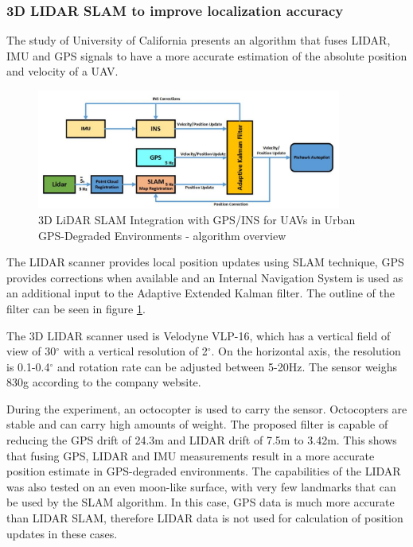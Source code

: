 \subsubsection{3D LIDAR SLAM to improve localization accuracy} \label{lidar_for_localization}

The study of University of California\cite{hening20173d} presents an algorithm that fuses LIDAR, IMU and GPS signals 
to have a more accurate estimation of the absolute position and velocity of a UAV. 
\begin{figure}[!ht]
    \centering
	\includegraphics[width=100mm, keepaspectratio]{figures/hening_filter.png}
    \caption{3D LiDAR SLAM Integration with GPS/INS for UAVs in Urban GPS-Degraded Environments \cite{hening20173d} - algorithm overview}
    \label{fig:haning_filter}
\end{figure}
The LIDAR scanner provides local position updates using SLAM technique, GPS provides corrections when available and an Internal
Navigation System is used as an additional input to the Adaptive Extended Kalman filter. The outline of the filter can be seen 
in figure \ref{fig:haning_filter}.



The 3D LIDAR scanner used is Velodyne VLP-16, which has a vertical field of view of 30$^\circ$ with a vertical resolution 
of 2$^\circ$. On the horizontal axis, the resolution is 0.1-0.4$^\circ$ and rotation rate can be adjusted between 5-20Hz.
The sensor weighs 830g according to the company website.

During the experiment, an octocopter is used to carry the sensor. Octocopters are stable and can carry high amounts of weight.
The proposed filter is capable of reducing the GPS drift of 24.3m and LIDAR drift of 7.5m to 3.42m.
This shows that fusing GPS, LIDAR and IMU measurements result in a more accurate position estimate in
GPS-degraded environments. The capabilities of the LIDAR was also tested on an even moon-like surface, 
with very few landmarks that can be used by the SLAM algorithm. In this case, GPS data is much more 
accurate than LIDAR SLAM, therefore LIDAR data is not used for calculation of position updates in these cases.


